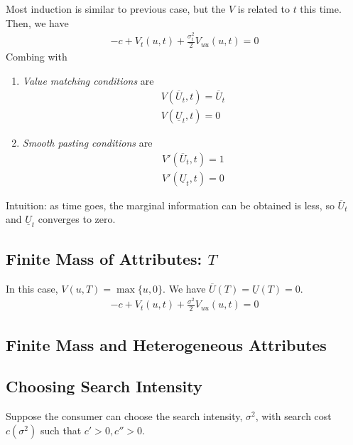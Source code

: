 \documentclass[11pt]{elegantbook}
\begin{document}
Most induction is similar to previous case, but the $V$ is related to $t$ this time. Then, we have
\begin{equation}
    \begin{aligned}
        -c+V_t(u,t)+\frac{\sigma_t^2}{2}V_{uu}(u,t)=0
    \end{aligned}
    \nonumber
\end{equation}
Combing with
\begin{enumerate}
    \item \textit{Value matching conditions} are
    \begin{equation}
        \begin{aligned}
            V(\overline{U}_t,t)=\overline{U}_t\\
            V(\underline{U}_t,t)=0
        \end{aligned}
        \nonumber
    \end{equation}
    \item \textit{Smooth pasting conditions} are
    \begin{equation}
        \begin{aligned}
            V'(\overline{U}_t,t)=1\\
            V'(\underline{U}_t,t)=0
        \end{aligned}
        \nonumber
    \end{equation}
\end{enumerate}
Intuition: as time goes, the marginal information can be obtained is less, so $\overline{U}_t$ and $\underline{U}_t$ converges to zero.


\subsection{Finite Mass of Attributes: $T$}
In this case, $V(u,T)=\max\{u,0\}$. We have $\overline{U}(T)=\underline{U}(T)=0$.
\begin{equation}
    \begin{aligned}
        -c+V_t(u,t)+\frac{\sigma^2}{2}V_{uu}(u,t)=0
    \end{aligned}
    \nonumber
\end{equation}


\subsection{Finite Mass and Heterogeneous Attributes}


\subsection{Choosing Search Intensity}
Suppose the consumer can choose the search intensity, $\sigma^2$, with search cost $c(\sigma^2)$ such that $c'>0, c''>0$.
\end{document}
